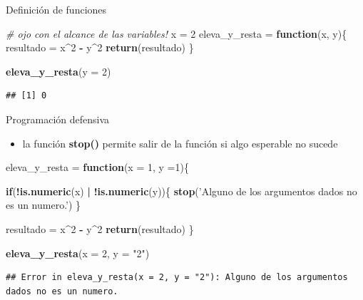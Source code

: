 \documentclass[ignorenonframetext,]{beamer}
\newenvironment{Shaded}{\begin{snugshade}}{\end{snugshade}}
\newcommand{\CommentTok}[1]{\textcolor[rgb]{0.56,0.35,0.01}{\textit{#1}}}
\newcommand{\ControlFlowTok}[1]{\textcolor[rgb]{0.13,0.29,0.53}{\textbf{#1}}}
\newcommand{\DataTypeTok}[1]{\textcolor[rgb]{0.13,0.29,0.53}{#1}}
\newcommand{\DecValTok}[1]{\textcolor[rgb]{0.00,0.00,0.81}{#1}}
\newcommand{\KeywordTok}[1]{\textcolor[rgb]{0.13,0.29,0.53}{\textbf{#1}}}
\newcommand{\NormalTok}[1]{#1}
\newcommand{\OperatorTok}[1]{\textcolor[rgb]{0.81,0.36,0.00}{\textbf{#1}}}
\newcommand{\StringTok}[1]{\textcolor[rgb]{0.31,0.60,0.02}{#1}}
\providecommand{\tightlist}{%
  \setlength{\itemsep}{0pt}\setlength{\parskip}{0pt}}
\begin{document}
\begin{frame}[fragile]{Definición de funciones}
\protect\hypertarget{definiciuxf3n-de-funciones-6}{}

\begin{Shaded}
\begin{Highlighting}[]
\CommentTok{# ojo con el alcance de las variables!}
\NormalTok{x =}\StringTok{ }\DecValTok{2}
\NormalTok{eleva_y_resta =}\StringTok{ }\ControlFlowTok{function}\NormalTok{(x, y)\{}
\NormalTok{  resultado =}\StringTok{ }\NormalTok{x}\OperatorTok{^}\DecValTok{2} \OperatorTok{-}\StringTok{ }\NormalTok{y}\OperatorTok{^}\DecValTok{2}
  \KeywordTok{return}\NormalTok{(resultado)}
\NormalTok{\}}

\KeywordTok{eleva_y_resta}\NormalTok{(}\DataTypeTok{y =} \DecValTok{2}\NormalTok{)}
\end{Highlighting}
\end{Shaded}

\begin{verbatim}
## [1] 0
\end{verbatim}

\end{frame}

\begin{frame}[fragile]{Programación defensiva}
\protect\hypertarget{programaciuxf3n-defensiva}{}

\begin{itemize}
\tightlist
\item
  la función \textbf{stop()} permite salir de la función si algo
  esperable no sucede
\end{itemize}

\small

\begin{Shaded}
\begin{Highlighting}[]
\NormalTok{eleva_y_resta =}\StringTok{ }\ControlFlowTok{function}\NormalTok{(}\DataTypeTok{x =} \DecValTok{1}\NormalTok{, }\DataTypeTok{y =}\DecValTok{1}\NormalTok{)\{}
  
  \ControlFlowTok{if}\NormalTok{(}\OperatorTok{!}\KeywordTok{is.numeric}\NormalTok{(x) }\OperatorTok{|}\StringTok{ }\OperatorTok{!}\KeywordTok{is.numeric}\NormalTok{(y))\{}
    \KeywordTok{stop}\NormalTok{(}\StringTok{'Alguno de los argumentos dados no es un numero.'}\NormalTok{)}
\NormalTok{  \}}
  
\NormalTok{  resultado =}\StringTok{ }\NormalTok{x}\OperatorTok{^}\DecValTok{2} \OperatorTok{-}\StringTok{ }\NormalTok{y}\OperatorTok{^}\DecValTok{2}
  \KeywordTok{return}\NormalTok{(resultado)}
\NormalTok{\}}

\KeywordTok{eleva_y_resta}\NormalTok{(}\DataTypeTok{x =} \DecValTok{2}\NormalTok{, }\DataTypeTok{y =} \StringTok{"2"}\NormalTok{)}
\end{Highlighting}
\end{Shaded}

\begin{verbatim}
## Error in eleva_y_resta(x = 2, y = "2"): Alguno de los argumentos dados no es un numero.
\end{verbatim}

\normalsize

\end{frame}
\end{document}
